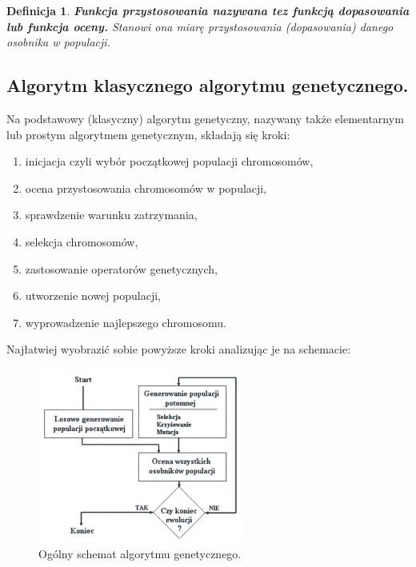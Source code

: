 \documentclass[twoside,12pt]{report}
\newtheorem{definition}{Definicja} %
\begin{document}
\vspace*{10px}

\begin{definition}
\textbf{Funkcja przystosowania nazywana tez funkcją dopasowania lub funkcja oceny.} Stanowi ona miarę przystosowania (dopasowania) danego osobnika w populacji.
\end{definition}

\subsection{Algorytm klasycznego algorytmu genetycznego.}

Na podstawowy (klasyczny) algorytm genetyczny, nazywany także elementarnym
lub prostym algorytmem genetycznym, składają się kroki:

\begin{enumerate}
\item inicjacja czyli wybór początkowej populacji chromosomów,
\item ocena przystosowania chromosomów w populacji,
\item sprawdzenie warunku zatrzymania,
\item selekcja chromosomów,
\item zastosowanie operatorów genetycznych,
\item utworzenie nowej populacji,
\item wyprowadzenie najlepszego chromosomu.
\end{enumerate}

Najłatwiej wyobrazić sobie powyższe kroki analizując je na schemacie:

\begin{figure}[ht]
\begin{center}
\includegraphics[width=0.6\textwidth]{img/ogolgene}
\caption{Ogólny schemat algorytmu genetycznego.}
\end{center}
\end{figure}
\end{document}
